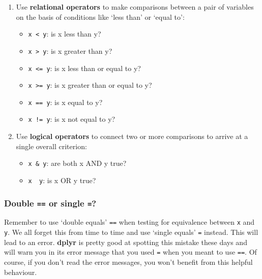 \documentclass[
]{book}
\providecommand{\tightlist}{%
  \setlength{\itemsep}{0pt}\setlength{\parskip}{0pt}}
\newenvironment{greybox}{
  \definecolor{shadecolor}{rgb}{0.95,0.95,0.95}  %
  \color{black}
  \begin{shaded}}
 {\end{shaded}}
\newenvironment{infobox}[1]
  {
  \begin{itemize}
  \renewcommand{\labelitemi}{
    \raisebox{-.7\height}[0pt][0pt]{
      {\setkeys{Gin}{width=3em,keepaspectratio}
        \texttt{[image: images/\#1]}}
    }
  }
  \setlength{\fboxsep}{1em}
  \begin{greybox}
  \item
  }
  {
  \end{greybox}
  \end{itemize}
  }
\begin{document}
\begin{enumerate}
\def\labelenumi{\arabic{enumi}.}
\item
  Use \textbf{relational operators} to make comparisons between a pair of variables on the basis of conditions like `less than' or `equal to':

  \begin{itemize}
  \tightlist
  \item
    \texttt{x\ \textless{}\ y}: is x less than y?
  \item
    \texttt{x\ \textgreater{}\ y}: is x greater than y?
  \item
    \texttt{x\ \textless{}=\ y}: is x less than or equal to y?
  \item
    \texttt{x\ \textgreater{}=\ y}: is x greater than or equal to y?
  \item
    \texttt{x\ ==\ y}: is x equal to y?
  \item
    \texttt{x\ !=\ y}: is x not equal to y?
  \end{itemize}
\item
  Use \textbf{logical operators} to connect two or more comparisons to arrive at a single overall criterion:

  \begin{itemize}
  \tightlist
  \item
    \texttt{x\ \&\ y}: are both x AND y true?
  \item
    \texttt{x\ \textbar{}\ y}: is x OR y true?
  \end{itemize}
\end{enumerate}

\begin{infobox}{warning}

\hypertarget{double-or-single}{%
\subsubsection*{\texorpdfstring{Double \texttt{==} or single \texttt{=}?}{Double == or single =?}}\label{double-or-single}}

Remember to use `double equals' \texttt{==} when testing for equivalence between \texttt{x} and \texttt{y}. We all forget this from time to time and use `single equals' \texttt{=} instead. This will lead to an error. \textbf{dplyr} is pretty good at spotting this mistake these days and will warn you in its error message that you used \texttt{=} when you meant to use \texttt{==}. Of course, if you don't read the error messages, you won't benefit from this helpful behaviour.

\end{infobox}
\end{document}
